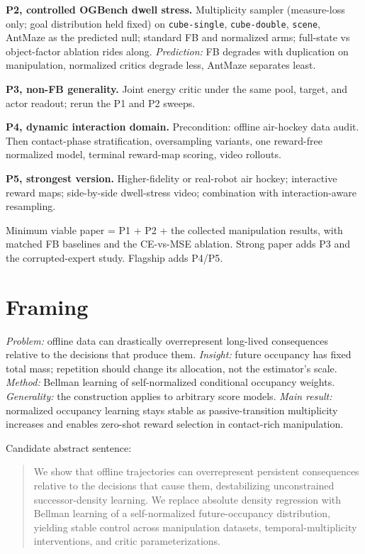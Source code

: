 \documentclass{article}
\begin{document}
\textbf{P2, controlled OGBench dwell stress.}
Multiplicity sampler (measure-loss only; goal distribution held fixed) on \texttt{cube-single}, \texttt{cube-double}, \texttt{scene}, AntMaze as the predicted null; standard FB and normalized arms; full-state vs object-factor ablation rides along.
\emph{Prediction:} FB degrades with duplication on manipulation, normalized critics degrade less, AntMaze separates least.

\textbf{P3, non-FB generality.}
Joint energy critic under the same pool, target, and actor readout; rerun the P1 and P2 sweeps.

\textbf{P4, dynamic interaction domain.}
Precondition: offline air-hockey data audit.
Then contact-phase stratification, oversampling variants, one reward-free normalized model, terminal reward-map scoring, video rollouts.

\textbf{P5, strongest version.}
Higher-fidelity or real-robot air hockey; interactive reward maps; side-by-side dwell-stress video; combination with interaction-aware resampling.

Minimum viable paper = P1 + P2 + the collected manipulation results, with matched FB baselines and the CE-vs-MSE ablation.
Strong paper adds P3 and the corrupted-expert study.
Flagship adds P4/P5.

\section{Framing}
\label{sec:framing}

\emph{Problem:} offline data can drastically overrepresent long-lived consequences relative to the decisions that produce them.
\emph{Insight:} future occupancy has fixed total mass; repetition should change its allocation, not the estimator's scale.
\emph{Method:} Bellman learning of self-normalized conditional occupancy weights.
\emph{Generality:} the construction applies to arbitrary score models.
\emph{Main result:} normalized occupancy learning stays stable as passive-transition multiplicity increases and enables zero-shot reward selection in contact-rich manipulation.

Candidate abstract sentence:
\begin{quote}
We show that offline trajectories can overrepresent persistent consequences relative to the decisions that cause them, destabilizing unconstrained successor-density learning.
We replace absolute density regression with Bellman learning of a self-normalized future-occupancy distribution, yielding stable control across manipulation datasets, temporal-multiplicity interventions, and critic parameterizations.
\end{quote}



\end{document}
